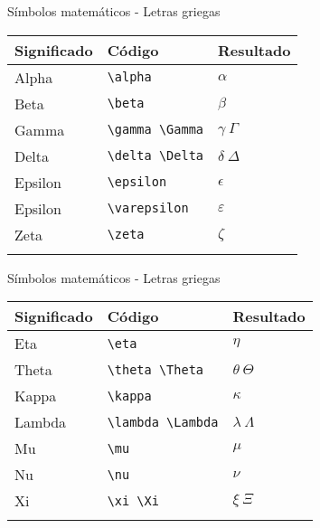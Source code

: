 \documentclass[
  ignorenonframetext,
]{beamer}
\begin{document}
\begin{frame}[fragile]{Símbolos matemáticos - Letras griegas}
\protect\hypertarget{suxedmbolos-matemuxe1ticos---letras-griegas}{}
\begin{longtable}[]{@{}lll@{}}
\toprule\noalign{}
Significado & Código & Resultado \\
\midrule\noalign{}
\endhead
Alpha & \texttt{\textbackslash{}alpha} & \(\alpha\) \\
Beta & \texttt{\textbackslash{}beta} & \(\beta\) \\
Gamma & \texttt{\textbackslash{}gamma\ \textbackslash{}Gamma} &
\(\gamma\  \Gamma\) \\
Delta & \texttt{\textbackslash{}delta\ \textbackslash{}Delta} &
\(\delta\  \Delta\) \\
Epsilon & \texttt{\textbackslash{}epsilon} & \(\epsilon\) \\
Epsilon & \texttt{\textbackslash{}varepsilon} & \(\varepsilon\) \\
Zeta & \texttt{\textbackslash{}zeta} & \(\zeta\) \\
\bottomrule\noalign{}
\end{longtable}
\end{frame}

\begin{frame}[fragile]{Símbolos matemáticos - Letras griegas}
\protect\hypertarget{suxedmbolos-matemuxe1ticos---letras-griegas-1}{}
\begin{longtable}[]{@{}lll@{}}
\toprule\noalign{}
Significado & Código & Resultado \\
\midrule\noalign{}
\endhead
Eta & \texttt{\textbackslash{}eta} & \(\eta\) \\
Theta & \texttt{\textbackslash{}theta\ \textbackslash{}Theta} &
\(\theta\ \Theta\) \\
Kappa & \texttt{\textbackslash{}kappa} & \(\kappa\) \\
Lambda & \texttt{\textbackslash{}lambda\ \textbackslash{}Lambda} &
\(\lambda\  \Lambda\) \\
Mu & \texttt{\textbackslash{}mu} & \(\mu\) \\
Nu & \texttt{\textbackslash{}nu} & \(\nu\) \\
Xi & \texttt{\textbackslash{}xi\ \textbackslash{}Xi} & \(\xi\ \Xi\) \\
\bottomrule\noalign{}
\end{longtable}
\end{frame}
\end{document}
